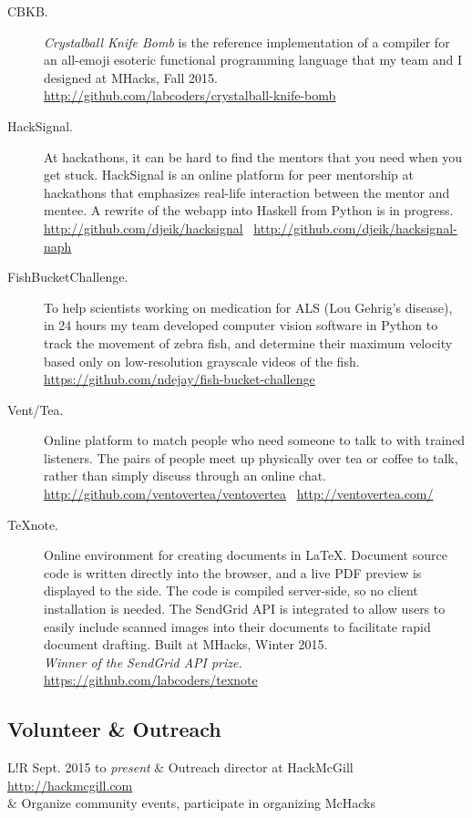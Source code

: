 \documentclass{article}
\newcommand\VRule{\color{lightgray}\vrule width 0.5pt}
\begin{document}
\begin{description}
    \item[CBKB.] \emph{Crystalball Knife Bomb} is the reference implementation
        of a compiler for an all-emoji esoteric functional programming language
        that my team and I designed at MHacks, Fall 2015. \\
        \url{http://github.com/labcoders/crystalball-knife-bomb}
    \item[HackSignal.] At hackathons, it can be hard to find the mentors that
        you need when you get stuck. HackSignal is an online platform for peer
        mentorship at hackathons that emphasizes real-life interaction between
        the mentor and mentee. A rewrite of the webapp into Haskell from Python
        is in progress. \\
        \url{http://github.com/djeik/hacksignal}~
        \url{http://github.com/djeik/hacksignal-naph}
    \item[FishBucketChallenge.] To help scientists working on medication for
        ALS (Lou Gehrig's disease), in 24 hours my team developed computer
        vision software in Python to track the movement of zebra fish, and
        determine their maximum velocity based only on low-resolution grayscale
        videos of the fish. \\
        \url{https://github.com/ndejay/fish-bucket-challenge}
    \item[Vent/Tea.] Online platform to match people who need someone to talk
        to with trained listeners. The pairs of people meet up physically over
        tea or coffee to talk, rather than simply discuss through an online
        chat. \\
        \url{http://github.com/ventovertea/ventovertea}~
        \url{http://ventovertea.com/}
    \item[TeXnote.] Online environment for creating documents in \LaTeX.
        Document source code is written directly into the browser, and a live
        PDF preview is displayed to the side. The code is compiled server-side,
        so no client installation is needed. The SendGrid API is integrated to
        allow users to easily include scanned images into their documents to
        facilitate rapid document drafting. Built at MHacks, Winter 2015. \\
        \emph{Winner of the SendGrid API prize.} \\
        \url{https://github.com/labcoders/texnote}
\end{description}

\subsection*{Volunteer \& Outreach}

\begin{tabular}[h]{L!{\VRule}R}
    Sept. 2015 to \emph{present}
        & Outreach director at HackMcGill ~ \url{http://hackmcgill.com} \\
        & Organize community events, participate in organizing McHacks
\end{tabular}
\end{document}

